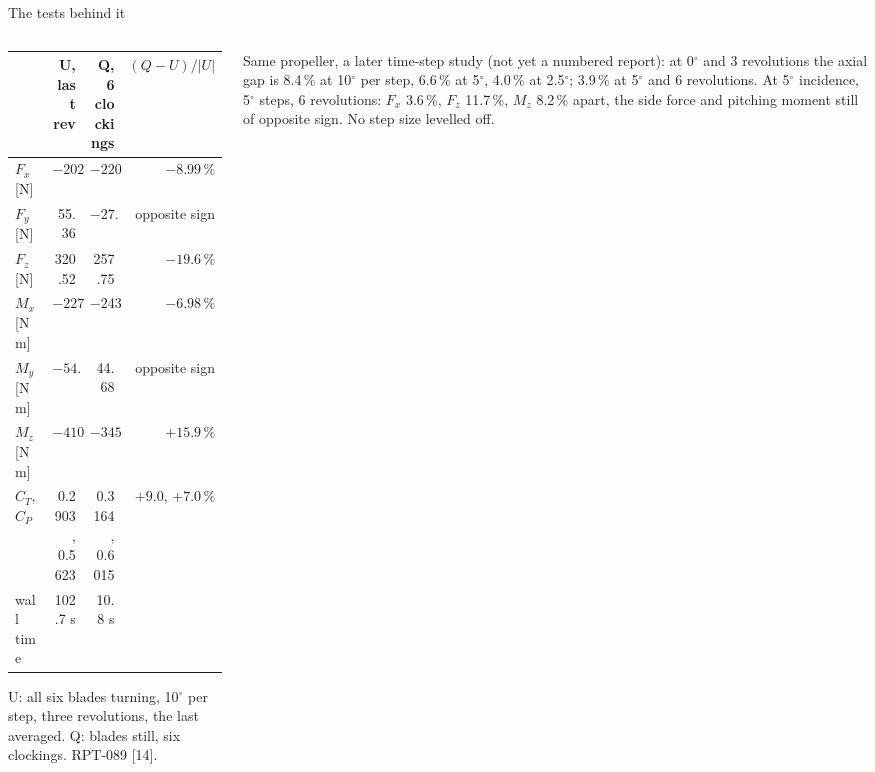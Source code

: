 \begin{frame}{The tests behind it}
\begin{columns}[T]
\begin{column}{0.60\textwidth}
{\ftstablesize\renewcommand{\arraystretch}{1.05}
\begin{tabular*}{\linewidth}{@{\extracolsep{\fill}}lrrr@{}}
\toprule
 & U, last rev & Q, 6 clockings & \((Q-U)/|U|\) \\
\midrule
\(F_x\) [N] & \(-2022.76\) & \(-2204.64\) & \(-8.99\,\%\) \\
\(F_y\) [N] & 55.36 & \(-27.09\) & opposite sign \\
\(F_z\) [N] & 320.52 & 257.75 & \(-19.6\,\%\) \\
\(M_x\) [N m] & \(-2274.67\) & \(-2433.44\) & \(-6.98\,\%\) \\
\(M_y\) [N m] & \(-54.83\) & 44.68 & opposite sign \\
\(M_z\) [N m] & \(-410.73\) & \(-345.45\) & \(+15.9\,\%\) \\
\midrule
\(C_T\), \(C_P\) & 0.2903, 0.5623 & 0.3164, 0.6015 & \(+9.0\), \(+7.0\,\%\) \\
wall time & 102.7 s & 10.8 s & \\
\bottomrule
\end{tabular*}}
\par\vspace{0.5mm}
{\tiny\color{SoftGray} U: all six blades turning, 10\(^\circ\) per step, three
revolutions, the last averaged. Q: blades still, six clockings. RPT-089
[14].\par}
\end{column}
\begin{column}{0.37\textwidth}
\begin{ftsevidence}
\scriptsize Same propeller, a later time-step study (not yet a numbered
report): at 0\(^\circ\) and 3 revolutions the axial gap is 8.4\,\% at
10\(^\circ\) per step, 6.6\,\% at 5\(^\circ\), 4.0\,\% at 2.5\(^\circ\); 3.9\,\%
at 5\(^\circ\) and 6 revolutions. At 5\(^\circ\) incidence, 5\(^\circ\) steps,
6 revolutions: \(F_x\) 3.6\,\%, \(F_z\) 11.7\,\%, \(M_z\) 8.2\,\% apart, the
side force and pitching moment still of opposite sign. No step size levelled
off.
\end{ftsevidence}
\end{column}
\end{columns}
\end{frame}

